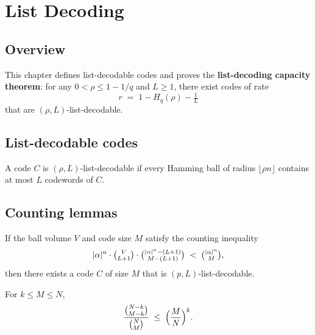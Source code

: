 \chapter{List Decoding}
\section{Overview}

This chapter defines list-decodable codes and proves the
\textbf{list-decoding capacity theorem}: for any $0<\rho\le 1-1/q$ and $L\ge 1$,
there exist codes of rate
\[
r \;=\; 1 - H_q(\rho) - \tfrac{1}{L}
\]
that are $(\rho,L)$-list-decodable.

\section{List-decodable codes}

\begin{definition}
\leanok
A code $C$ is $(\rho,L)$-list-decodable if every Hamming ball of radius
$\lfloor\rho n\rfloor$ contains at most $L$ codewords of $C$.
\end{definition}

\section{Counting lemmas}

\begin{lemma}
\leanok
{}
If the ball volume $V$ and code size $M$ satisfy the counting inequality
\[
|\alpha|^n\cdot\tbinom{V}{L+1}\cdot\tbinom{|\alpha|^n-(L+1)}{M-(L+1)}
\;<\;
\tbinom{|\alpha|^n}{M},
\]
then there exists a code $C$ of size $M$ that is $(p,L)$-list-decodable.
\end{lemma}

\begin{lemma}
\leanok
For $k\le M\le N$,
\[
\frac{\binom{N-k}{M-k}}{\binom{N}{M}} \;\le\; \Bigl(\frac{M}{N}\Bigr)^k.
\]
\end{lemma}

